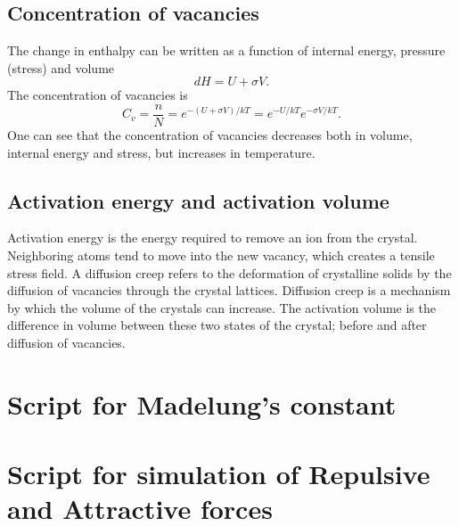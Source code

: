 \documentclass[10pt, a4paper]{amsart}
\begin{document}
\subsection{Concentration of vacancies}
The change in enthalpy can be written as a function of internal energy, pressure (stress) and volume
\begin{equation}
dH = U + \sigma V.
\end{equation}
The concentration of vacancies is
\begin{equation}
C_v = \frac{n}{N} = e^{-(U+\sigma V)/kT} = e^{-U/kT}e^{-\sigma V/kT}.
\end{equation}
One can see that the concentration of vacancies decreases both in volume, internal energy and stress, but increases in temperature.

\subsection{Activation energy and activation volume}
Activation energy is the energy required to remove an ion from the crystal. Neighboring atoms tend to move into the new vacancy, which creates a tensile stress field. A diffusion creep refers to the deformation of crystalline solids by the diffusion of vacancies through the crystal lattices. Diffusion creep is a mechanism by which the volume of the crystals can increase. The activation volume is the difference in volume between these two states of the crystal; before and after diffusion of vacancies. 

\vfill

\pagebreak

\begin{appendices}

\section{Script for Madelung's constant}
\label{app:madelung}


\section{Script for simulation of Repulsive and Attractive forces}
\label{app:forces}


\end{appendices}
\end{document}
